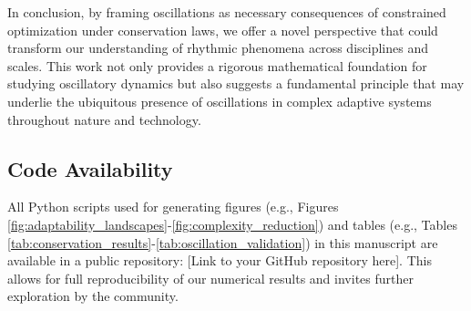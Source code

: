 \documentclass[11pt,a4paper]{article}
\begin{document}
In conclusion, by framing oscillations as necessary consequences of constrained optimization under conservation laws, we offer a novel perspective that could transform our understanding of rhythmic phenomena across disciplines and scales. This work not only provides a rigorous mathematical foundation for studying oscillatory dynamics but also suggests a fundamental principle that may underlie the ubiquitous presence of oscillations in complex adaptive systems throughout nature and technology.

\subsection*{Code Availability}
All Python scripts used for generating figures (e.g., Figures \ref{fig:adaptability_landscapes}-\ref{fig:complexity_reduction}) and tables (e.g., Tables \ref{tab:conservation_results}-\ref{tab:oscillation_validation}) in this manuscript are available in a public repository: [Link to your GitHub repository here]. This allows for full reproducibility of our numerical results and invites further exploration by the community.



\end{document}
